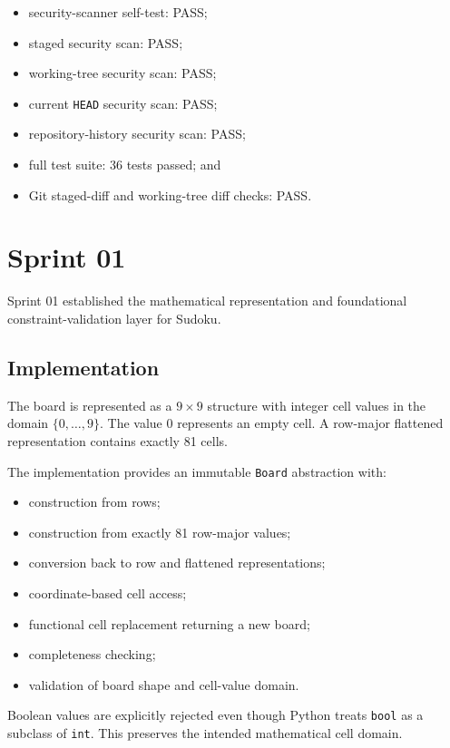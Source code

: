 \documentclass[11pt,a4paper]{article}
\begin{document}
\begin{itemize}
    \item security-scanner self-test: PASS;
    \item staged security scan: PASS;
    \item working-tree security scan: PASS;
    \item current \texttt{HEAD} security scan: PASS;
    \item repository-history security scan: PASS;
    \item full test suite: 36 tests passed; and
    \item Git staged-diff and working-tree diff checks: PASS.
\end{itemize}

\section{Sprint 01}

Sprint 01 established the mathematical representation and foundational
constraint-validation layer for Sudoku.

\subsection{Implementation}

The board is represented as a $9\times9$ structure with integer cell values in
the domain $\{0,\ldots,9\}$. The value $0$ represents an empty cell. A
row-major flattened representation contains exactly 81 cells.

The implementation provides an immutable \texttt{Board} abstraction with:

\begin{itemize}
    \item construction from rows;
    \item construction from exactly 81 row-major values;
    \item conversion back to row and flattened representations;
    \item coordinate-based cell access;
    \item functional cell replacement returning a new board;
    \item completeness checking;
    \item validation of board shape and cell-value domain.
\end{itemize}

Boolean values are explicitly rejected even though Python treats
\texttt{bool} as a subclass of \texttt{int}. This preserves the intended
mathematical cell domain.
\end{document}
